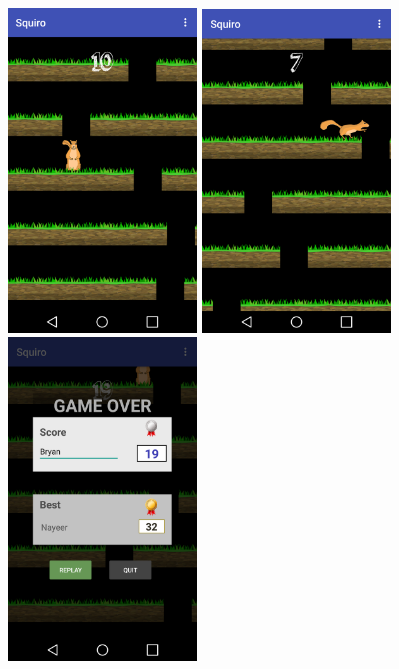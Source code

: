 \documentclass[12pt,a4paper,abstract=on,parskip=full]{scrartcl}
\begin{document}
\vspace{12pt}
\hspace{5pt}
\includegraphics[width=5cm]{screenshot1.png}
\hspace{5pt}
\includegraphics[width=5cm]{screenshot2.png}
\hspace{5pt}
\includegraphics[width=5cm]{screenshot3.png}
\end{document}
